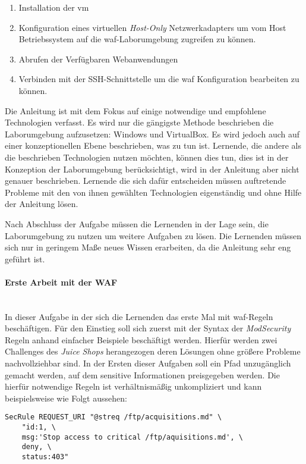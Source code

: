 \begin{enumerate}
    \item Installation der \ac{vm}
    \item Konfiguration eines virtuellen \textit{Host-Only} Netzwerkadapters um vom Host Betriebssystem auf die \ac{waf}-Laborumgebung zugreifen zu können.
    \item Abrufen der Verfügbaren Webanwendungen
    \item Verbinden mit der SSH-Schnittstelle um die \ac{waf} Konfiguration bearbeiten zu können.
\end{enumerate}

Die Anleitung ist mit dem Fokus auf einige notwendige und empfohlene Technologien verfasst.
Es wird nur die gängigste Methode beschrieben die Laborumgebung aufzusetzen: Windows und VirtualBox.
Es wird jedoch auch auf einer konzeptionellen Ebene beschrieben, was zu tun ist.
Lernende, die andere als die beschrieben Technologien nutzen möchten, können dies tun, dies ist in der Konzeption der Laborumgebung berücksichtigt, wird in der Anleitung aber nicht genauer beschrieben.
Lernende die sich dafür entscheiden müssen auftretende Probleme mit den von ihnen gewählten Technologien eigenständig und ohne Hilfe der Anleitung lösen.

Nach Abschluss der Aufgabe müssen die Lernenden in der Lage sein, die Laborumgebung zu nutzen um weitere Aufgaben zu lösen.
Die Lernenden müssen sich nur in geringem Maße neues Wissen erarbeiten, da die Anleitung sehr eng geführt ist.

\paragraph{Erste Arbeit mit der WAF}\ \\

In dieser Aufgabe in der sich die Lernenden das erste Mal mit \ac{waf}-Regeln beschäftigen.
Für den Einstieg soll sich zuerst mit der Syntax der \textit{ModSecurity} Regeln anhand einfacher Beispiele beschäftigt werden.
Hierfür werden zwei Challenges des \textit{Juice Shops} herangezogen deren Lösungen ohne größere Probleme nachvollziehbar sind.
In der Ersten dieser Aufgaben soll ein Pfad unzugänglich gemacht werden, auf dem sensitive Informationen preisgegeben werden.
Die hierfür notwendige Regeln ist verhältnismäßig unkompliziert und kann beispielsweise wie Folgt aussehen:

\begin{verbatim}
SecRule REQUEST_URI "@streq /ftp/acquisitions.md" \
    "id:1, \
    msg:'Stop access to critical /ftp/aquisitions.md', \
    deny, \
    status:403"
\end{verbatim}

